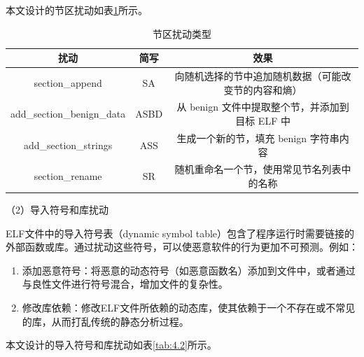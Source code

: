 本文设计的节区扰动如表\ref{tab:4.1}所示。


\begin{table}[htbp]
	\centering
	\caption{节区扰动类型}\label{tab:4.1}
	\begin{tabular*}{\textwidth}{@{\extracolsep{\fill}}ccc}
		\toprule
		扰动 & 简写 & 效果 \\
		\midrule
		section\_append & SA & 向随机选择的节中追加随机数据（可能改变节的内容和熵） \\
		add\_section\_benign\_data & ASBD & 从 benign 文件中提取整个节，并添加到目标 ELF 中 \\
		add\_section\_strings & ASS & 生成一个新的节，填充 benign 字符串内容 \\
		section\_rename & SR & 随机重命名一个节，使用常见节名列表中的名称 \\
		\bottomrule
	\end{tabular*}
\end{table}


（2）导入符号和库扰动


ELF文件中的导入符号表（dynamic symbol table）包含了程序运行时需要链接的外部函数或库。通过扰动这些符号，可以使恶意软件的行为更加不可预测。例如：
\begin{enumerate}
	


\item 添加恶意符号：将恶意的动态符号（如恶意函数名）添加到文件中，或者通过与良性文件进行符号混合，增加文件的复杂性。


\item 修改库依赖：修改ELF文件所依赖的动态库，使其依赖于一个不存在或不常见的库，从而打乱传统的静态分析过程。

\end{enumerate}
本文设计的导入符号和库扰动如表\ref{tab:4.2}所示。

